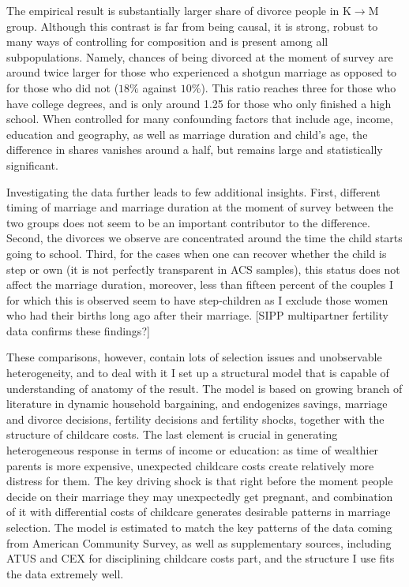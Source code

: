 \documentclass[12pt,letter]{article}
\begin{document}
The empirical result is substantially larger share of divorce people in K$\to$M group. Although this contrast is far from being causal, it is strong, robust to many ways of controlling for composition and is present among all subpopulations. Namely, chances of being divorced at the moment of survey are around twice larger for those who experienced a shotgun marriage as opposed to for those who did not ($18\%$ against $10\%$). This ratio reaches three for those who have college degrees, and is only around 1.25 for those who only finished a high school. When controlled for many confounding factors that include age, income, education and geography, as well as marriage duration and child's age, the difference in shares vanishes around a half, but remains large and statistically significant.  %

Investigating the data further leads to few additional insights. First, different timing of marriage and marriage duration at the moment of survey between the two groups does not seem to be an important contributor to the difference. Second, the divorces we observe are concentrated around the time the child starts going to school. Third, for the cases when one can recover whether the child is step or own (it is not perfectly transparent in ACS samples), this status does not affect the marriage duration, moreover, less than fifteen percent of the couples I for which this is observed seem to have step-children as I exclude those women who had their births long ago after their marriage. [SIPP multipartner fertility data confirms these findings?]

These comparisons, however, contain lots of selection issues and unobservable heterogeneity, and to deal with it I set up a structural model that is capable of understanding of anatomy of the result. The model is based on growing branch of literature in dynamic household bargaining, and endogenizes savings, marriage and divorce decisions, fertility decisions and fertility shocks, together with the structure of childcare costs. The last element is crucial in generating heterogeneous response in terms of income or education: as time of wealthier parents is more expensive, unexpected childcare costs create relatively more distress for them. The key driving shock is that right before the moment people decide on their marriage they may unexpectedly get pregnant, and combination of it with differential costs of childcare generates desirable patterns in marriage selection. The model is estimated to match the key patterns of the data coming from American Community Survey, as well as supplementary sources, including ATUS and CEX for disciplining childcare costs part, and the structure I use fits the data extremely well.
\end{document}
